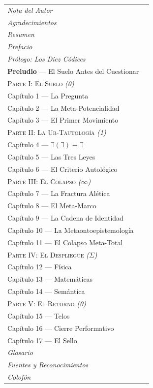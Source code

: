 \documentclass[10pt, openany, oneside]{book}
\renewcommand{\small}{\fontsize{9}{11.5}\selectfont}
\begin{document}
{\small
\noindent\begin{tabular}{@{} l @{\hspace{1em}} r @{}}
\textit{Nota del Autor} & \\
\textit{Agradecimientos} & \\
\textit{Resumen} & \\
\textit{Prefacio} & \\
\textit{Prólogo: Los Diez Códices} & \\[0.5em]
\textbf{Preludio} --- El Suelo Antes del Cuestionar & \\[0.8em]

\textsc{Parte I: El Suelo} \textit{(0)} & \\[0.3em]
\quad Capítulo 1 --- La Pregunta & \\
\quad Capítulo 2 --- La Meta-Potencialidad & \\
\quad Capítulo 3 --- El Primer Movimiento & \\[0.8em]

\textsc{Parte II: La Ur-Tautología} \textit{(1)} & \\[0.3em]
\quad Capítulo 4 --- $\exists(\exists) \equiv \exists$ & \\
\quad Capítulo 5 --- Las Tres Leyes & \\
\quad Capítulo 6 --- El Criterio Autológico & \\[0.8em]

\textsc{Parte III: El Colapso} \textit{($\infty$)} & \\[0.3em]
\quad Capítulo 7 --- La Fractura Alética & \\
\quad Capítulo 8 --- El Meta-Marco & \\
\quad Capítulo 9 --- La Cadena de Identidad & \\
\quad Capítulo 10 --- La Metaontoepistemología & \\
\quad Capítulo 11 --- El Colapso Meta-Total & \\[0.8em]

\textsc{Parte IV: El Despliegue} \textit{($\Sigma$)} & \\[0.3em]
\quad Capítulo 12 --- Física & \\
\quad Capítulo 13 --- Matemáticas & \\
\quad Capítulo 14 --- Semántica & \\[0.8em]

\textsc{Parte V: El Retorno} \textit{(0)} & \\[0.3em]
\quad Capítulo 15 --- Telos & \\
\quad Capítulo 16 --- Cierre Performativo & \\
\quad Capítulo 17 --- El Sello & \\[0.8em]

\textit{Glosario} & \\
\textit{Fuentes y Reconocimientos} & \\
\textit{Colofón} & \\
\end{tabular}
}
\end{document}
